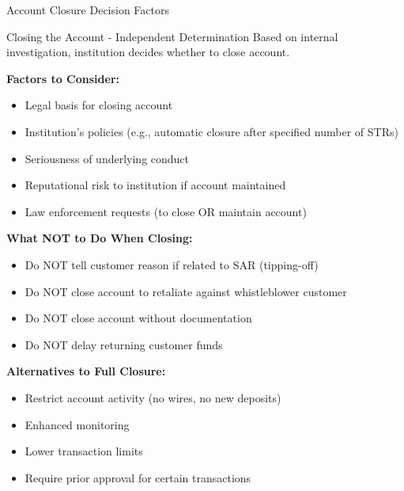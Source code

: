 \documentclass[11pt,a4paper]{beamer}
\begin{document}
	\begin{frame}{Account Closure Decision Factors}
		\begin{block}{Closing the Account - Independent Determination}
			Based on internal investigation, institution decides whether to close account.
		\end{block}
		\textbf{Factors to Consider:}
		\begin{itemize}
			\item Legal basis for closing account
			\item Institution's policies (e.g., automatic closure after specified number of STRs)
			\item Seriousness of underlying conduct
			\item Reputational risk to institution if account maintained
			\item Law enforcement requests (to close OR maintain account)
		\end{itemize}
		\textbf{What NOT to Do When Closing:}
		\begin{itemize}
			\item Do NOT tell customer reason if related to SAR (tipping-off)
			\item Do NOT close account to retaliate against whistleblower customer
			\item Do NOT close account without documentation
			\item Do NOT delay returning customer funds
		\end{itemize}
		\textbf{Alternatives to Full Closure:}
		\begin{itemize}
			\item Restrict account activity (no wires, no new deposits)
			\item Enhanced monitoring
			\item Lower transaction limits
			\item Require prior approval for certain transactions
		\end{itemize}
	\end{frame}
	
\end{document}
